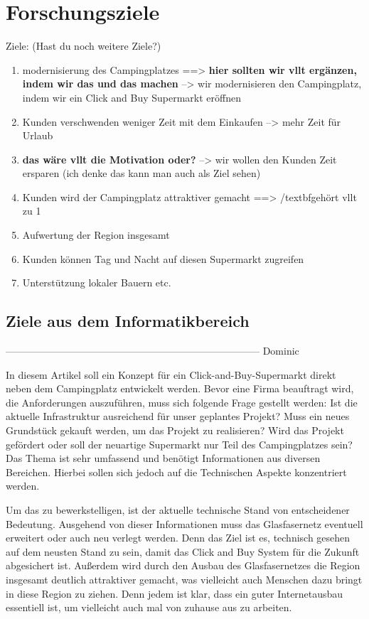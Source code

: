 \section{Forschungsziele}

Ziele: (Hast du noch weitere Ziele?)
\begin{enumerate}
    \item modernisierung des Campingplatzes ==> \textbf{hier sollten wir vllt ergänzen, indem wir das und das machen}
        --> wir modernisieren den Campingplatz, indem wir ein Click and Buy Supermarkt eröffnen
    \item Kunden verschwenden weniger Zeit mit dem Einkaufen --> mehr Zeit für Urlaub 
    \item \textbf{das wäre vllt die Motivation oder?} --> wir wollen den Kunden Zeit ersparen (ich denke das kann man auch als Ziel sehen)
    \item Kunden wird der Campingplatz attraktiver gemacht ==> /textbf{gehört vllt zu 1}
    \item Aufwertung der Region insgesamt
    \item Kunden können Tag und Nacht auf diesen Supermarkt zugreifen
    \item Unterstützung lokaler Bauern etc.
\end{enumerate}


\subsection{Ziele aus dem Informatikbereich}

----------------------------------------------------------------------------- Dominic

In diesem Artikel soll ein Konzept für ein Click-and-Buy-Supermarkt direkt neben dem Campingplatz entwickelt werden. 
Bevor eine Firma beauftragt wird, die Anforderungen auszuführen, muss sich folgende Frage gestellt werden: Ist die
aktuelle Infrastruktur ausreichend für unser  geplantes Projekt? Muss ein neues Grundstück gekauft werden, um das 
Projekt zu realisieren? Wird das Projekt gefördert oder soll der neuartige Supermarkt nur Teil des Campingplatzes sein?
Das Thema ist sehr umfassend und benötigt Informationen aus  diversen Bereichen. Hierbei sollen sich jedoch auf die 
Technischen Aspekte konzentriert werden.


Um das zu bewerkstelligen, ist der aktuelle technische Stand von entscheidener Bedeutung. 
Ausgehend von dieser Informationen muss das Glasfasernetz eventuell erweitert oder auch neu verlegt werden.
Denn das Ziel ist es, technisch gesehen auf dem neusten Stand zu sein, damit das Click and Buy System für die Zukunft abgesichert ist.
Außerdem wird durch den Ausbau des Glasfasernetzes die Region insgesamt deutlich attraktiver gemacht, was vielleicht auch Menschen dazu bringt
in diese Region zu ziehen. Denn jedem ist klar, dass ein guter Internetausbau essentiell ist, um vielleicht auch mal von zuhause aus zu arbeiten.


